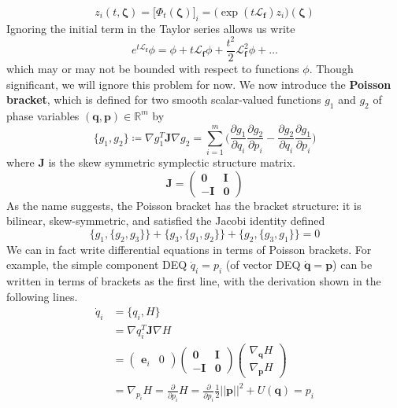 \documentclass{article}
\begin{document}
      \[z_i (t, \boldsymbol{\zeta}) = \big[ \Phi_t (\boldsymbol{\zeta}) \big]_i = \big(\exp(t \mathcal{L}_\mathbf{f}) z_i \big) (\boldsymbol{\zeta})\]
      Ignoring the initial term in the Taylor series allows us write 
      \[e^{t \mathcal{L}_\mathbf{f}} \phi = \phi + t \mathcal{L}_\mathbf{f} \phi + \frac{t^2}{2} \mathcal{L}_\mathbf{f}^2 \phi + \ldots\]
      which may or may not be bounded with respect to functions $\phi$. Though significant, we will ignore this problem for now. We now introduce the \textbf{Poisson bracket}, which is defined for two smooth scalar-valued functions $g_1$ and $g_2$ of phase variables $(\mathbf{q}, \mathbf{p}) \in \mathbb{R}^m$ by 
      \[\{g_1, g_2\} \coloneqq \nabla g_1^T \mathbf{J} \nabla g_2 = \sum_{i=1}^m \bigg( \frac{\partial g_1}{\partial q_i} \frac{\partial g_2}{\partial p_i} - \frac{ \partial g_2}{\partial q_i} \frac{\partial g_1}{\partial p_i} \bigg)\]
      where $\mathbf{J}$ is the skew symmetric symplectic structure matrix.
      \[\mathbf{J} = \begin{pmatrix} \mathbf{0} & \mathbf{I} \\ -\mathbf{I} & \mathbf{0} \end{pmatrix}\]
      As the name suggests, the Poisson bracket has the bracket structure: it is bilinear, skew-symmetric, and satisfied the Jacobi identity defined 
      \[\{ g_1, \{g_2, g_3\} \} + \{g_3, \{ g_1, g_2\}\} + \{g_2, \{g_3, g_1\}\} = 0\]
      We can in fact write differential equations in terms of Poisson brackets. For example, the simple component DEQ $\dot{q}_i = p_i$ (of vector DEQ $\mathbf{\dot{q}} = \mathbf{p}$) can be written in terms of brackets as the first line, with the derivation shown in the following lines. 
      \begin{align*}
        \dot{q}_i & = \{q_i, H\} \\
        & = \nabla q_i^T \mathbf{J} \nabla H \\
        & = \begin{pmatrix}
        \mathbf{e}_i & 0 
        \end{pmatrix} \begin{pmatrix}
        \mathbf{0} & \mathbf{I} \\ -\mathbf{I} & \mathbf{0} 
        \end{pmatrix} \begin{pmatrix}
        \nabla_\mathbf{q} H \\ \nabla_\mathbf{p} H 
        \end{pmatrix} \\
        & = \nabla_{p_i} H = \frac{\partial}{\partial p_i} H = \frac{\partial}{\partial p_i} \frac{1}{2} ||\mathbf{p}||^2 + U(\mathbf{q}) = p_i
      \end{align*}
\end{document}
